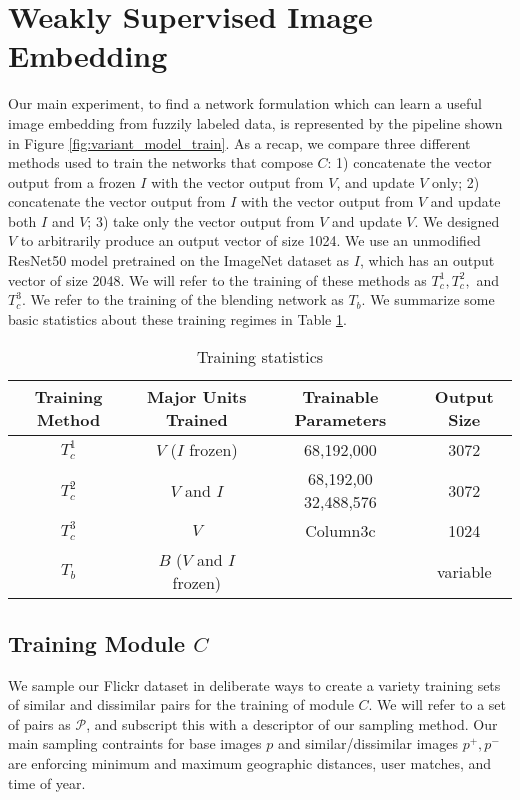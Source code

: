 \section{Weakly Supervised Image Embedding}
Our main experiment, to find a network formulation which can learn a useful image embedding from fuzzily labeled data, is represented by the pipeline shown in Figure \ref{fig:variant_model_train}. As a recap, we compare three different methods used to train the networks that compose $C$: 1) concatenate the vector output from a frozen $I$ with the vector output from $V$, and update $V$ only; 2) concatenate the vector output from $I$ with the vector output from $V$ and update both $I$ and $V$; 3) take only the vector output from $V$ and update $V$. We designed $V$ to arbitrarily produce an output vector of size 1024. We use an unmodified ResNet50 model pretrained on the ImageNet dataset as $I$, which has an output vector of size 2048. We will refer to the training of these methods as $T_c^1, T_c^2,$ and $T_c^3$. We refer to the training of the blending network as $T_b$. We summarize some basic statistics about these training regimes in Table \ref{table:embedding_parameters}.

\begin{table}
	\begin{tabular}{*{4}{c}}
		\toprule
		\bfseries Training Method & \bfseries Major Units Trained & \bfseries Trainable Parameters & \bfseries Output Size\\
		\midrule
		$T_c^1$ & $V$ ($I$ frozen) & 68,192,000 & 3072\\
		$T_c^2$ & $V$ and $I$ & 68,192,00 32,488,576 & 3072 \\
		$T_c^3$ & $V$ & Column3c & 1024\\
		$T_b$ & $B$ ($V$ and $I$ frozen) & & variable\\
		\bottomrule
	\end{tabular}
	\caption{Training statistics}
	\label{table:embedding_parameters}
\end{table}

\subsection{Training Module $C$}
We sample our Flickr dataset in deliberate ways to create a variety training sets of similar and dissimilar pairs for the training of module $C$. We will refer to a set of pairs as $\mathcal{P}$, and subscript this with a descriptor of our sampling method. Our main sampling contraints for base images $p$ and similar/dissimilar images $p^+, p^-$ are enforcing minimum and maximum geographic distances, user matches, and time of year.



